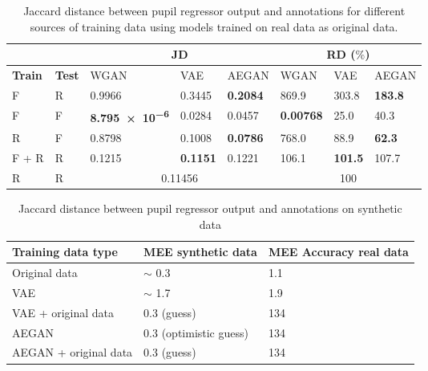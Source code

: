 \begin{table}[t]
    \centering
    \caption{Jaccard distance between pupil regressor output and annotations for different sources of training data using models trained on real data as original data.}
    \label{tab:quantitative_results}
    \begin{tabular}{|ll|lll|lll|}
        \cline{3-8}
        \multicolumn{2}{c}{ } & \multicolumn{3}{|c|}{JD} & \multicolumn{3}{c|}{RD ($\%$)} \\ \hline
        \textbf{Train} & \textbf{Test} & WGAN & VAE & AEGAN & WGAN & VAE & AEGAN \\ \hline
        F & R & \num{0.9966} & \num{0.3445} & \textbf{\num{0.2084}} & \num{869.9} & \num{303.8} & \textbf{\num{183.8}} \\
        F & F & \textbf{\num{8.795e-6}} & \num{0.0284} & \num{0.0457} & \textbf{\num{0.00768}} & \num{25.0} & \num{40.3} \\ 
        R & F & \num{0.8798} & \num{0.1008} & \textbf{\num{0.0786}} & \num{768.0} & \num{88.9} & \textbf{\num{62.3}} \\ 
        F + R & R & \num{0.1215} & \textbf{\num{0.1151}} & \num{0.1221} & \num{106.1} & \textbf{\num{101.5}} & \num{107.7} \\ 
        \hline
        R & R & \multicolumn{3}{c|}{\num{0.11456}} & \multicolumn{3}{c|}{100} \\
        \hline
    \end{tabular}
\end{table}

\begin{table}[t]
    \centering
    \caption{Jaccard distance between pupil regressor output and annotations on synthetic data}
    \label{tab:quantitative_results}
    \begin{tabular}{l|l|l}
    \hline
    Training data type      & MEE synthetic data  & MEE Accuracy real data \\ \hline
    Original data           & $\sim$ 0.3 & 1.1     \\
    VAE                     & $\sim$ 1.7 & 1.9     \\
    VAE + original data     & 0.3 (guess) & 134     \\
    AEGAN                   & 0.3 (optimistic guess) & 134     \\
    AEGAN + original data   & 0.3 (guess) & 134     \\
    \end{tabular}
\end{table}



